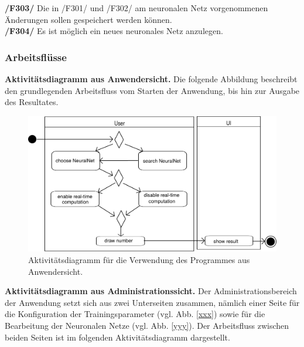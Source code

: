 \textbf{/F303/} Die in /F301/ und /F302/ am neuronalen Netz vorgenommenen Änderungen sollen gespeichert werden können.\\[-0.2cm]

\textbf{/F304/} Es ist möglich ein neues neuronales Netz anzulegen.\\[-0.2cm]


\subsubsection{Arbeitsflüsse}

\textbf{Aktivitätsdiagramm aus Anwendersicht.} Die folgende Abbildung beschreibt den grundlegenden Arbeitsfluss vom Starten der Anwendung, bis hin zur Ausgabe des Resultates.
\begin{figure}[H]
\begin{center}
\includegraphics[width=\textwidth]{Abbildungen/UML/uml_ronny/AD_UI.png}
\caption{Aktivitätsdiagramm für die Verwendung des Programmes aus Anwendersicht.}
\label{fig_AD_UI}
\end{center}
\end{figure}

\textbf{Aktivitätsdiagramm aus Administrationssicht.} Der Administrationsbereich der Anwendung setzt sich aus zwei Unterseiten zusammen, nämlich einer Seite für die Konfiguration der Trainingsparameter (vgl. Abb. \ref{xxx}) sowie für die Bearbeitung der Neuronalen Netze (vgl. Abb. \ref{yyy}). Der Arbeitsfluss zwischen beiden Seiten ist im folgenden Aktivitätsdiagramm dargestellt.


